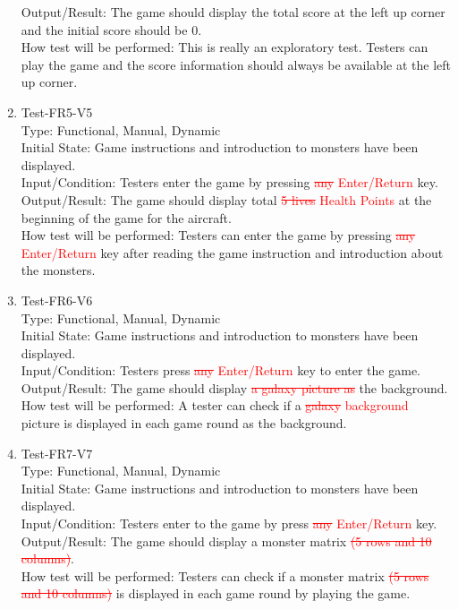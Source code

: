 \documentclass[12pt]{article}
\begin{document}
\begin{enumerate}[1.]
Output/Result: The game should display the total score
at the left
up corner and the initial score should be 0.\\
How test will be performed: This is really an exploratory 
test. Testers can play the game and the score information
should always be available at the left up corner.
\newpage
\item Test-FR5-V5\\
Type: Functional, Manual, Dynamic\\
Initial State: Game instructions and introduction to 
monsters have been displayed.\\
Input/Condition: Testers enter the game by pressing \textcolor{red}{\st{any} Enter/Return} key.\\
Output/Result: The game should display total \textcolor{red}{\st{5 lives} Health Points} at 
the beginning of the game for the aircraft.\\
How test will be performed: Testers can enter the game 
by pressing \textcolor{red}{\st{any} Enter/Return} key after reading the game instruction and
introduction about the monsters.
\item Test-FR6-V6\\
Type: Functional, Manual, Dynamic\\
Initial State: Game instructions and introduction to 
monsters have been displayed.\\
Input/Condition: Testers press \textcolor{red}{\st{any} Enter/Return} key to enter the game.\\
Output/Result: The game should display \textcolor{red}{\st{a galaxy picture as}} the background.\\
How test will be performed: A tester can check if a \textcolor{red}{\st{galaxy} background} picture is displayed in each game round as the 
background.
\item Test-FR7-V7\\
Type: Functional, Manual, Dynamic\\
Initial State: Game instructions and introduction to 
monsters have been displayed.\\
Input/Condition: Testers enter to the game by press \textcolor{red}{\st{any} Enter/Return}
key.\\
Output/Result: The game should display a monster matrix \textcolor{red}{\st{(5 rows and 10 columns)}}.\\
How test will be performed: Testers can check if a monster matrix \textcolor{red}{\st{(5 rows and 10 columns)}} is displayed in each game round by playing the game.

\end{enumerate}
\end{document}
